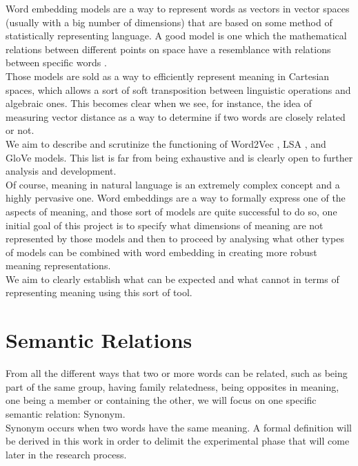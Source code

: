 \documentclass[runningheads]{llncs}
\begin{document}
Word embedding models are a way to represent words as vectors in vector spaces (usually with a big number of dimensions) that are based on some method of statistically representing language. A good model is one which the mathematical relations between different points on space have a resemblance with relations between specific words \cite{widdows2004geometry}.\\

Those models are sold as a way to efficiently represent meaning in Cartesian spaces, which allows a sort of soft transposition between linguistic operations and algebraic ones. This becomes clear when we see, for instance, the idea of measuring vector distance as a way to determine if two words are closely related or not.\\   

We aim to describe and scrutinize the functioning of Word2Vec \cite{mikolov2013}, LSA \cite{landauer2006latent}, and GloVe \cite{pennington2014glove} models. This list is far from being exhaustive and is clearly open to further analysis and development.\\ 

Of course, meaning in natural language is an extremely complex concept and a highly pervasive one. Word embeddings are a way to formally express one of the aspects of meaning, and those sort of models are quite successful to do so, one initial goal of this project is to specify what dimensions of meaning are not represented by those models and then to proceed by analysing what other types of models can be combined with word embedding in creating more robust meaning representations.\\

We aim to clearly establish what can be expected and what cannot in terms of representing meaning using this sort of tool.\\

\section{Semantic Relations}

From all the different ways that two or more words can be related, such as being part of the same group, having family relatedness, being opposites in meaning, one being a member or containing the other, we will focus on one specific semantic relation: Synonym.\\

Synonym occurs when two words have the same meaning. A formal definition will be derived in this work in order to delimit the experimental phase that will come later in the research process.\\
\end{document}
